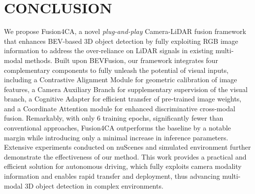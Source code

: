 \documentclass[letterpaper, 10 pt, conference]{ieeeconf}  %
\begin{document}
\section{CONCLUSION}
We propose Fusion4CA, a novel \textit{plug-and-play} Camera-LiDAR fusion framework that enhances BEV-based 3D object detection by fully exploiting RGB image information to address the over-reliance on LiDAR signals in existing multi-modal methods. Built upon BEVFusion, our framework integrates four complementary components to fully unleash the potential of visual inputs, including a Contrastive Alignment Module for geometric calibration of image features, a Camera Auxiliary Branch for supplementary supervision of the visual branch, a Cognitive Adapter \cite{yin20255} for efficient transfer of pre-trained image weights, and a Coordinate Attention module \cite{hou2021coordinate} for enhanced discriminative cross-modal fusion.
Remarkably, with only 6 training epochs, significantly fewer than conventional approaches, Fusion4CA outperforms the baseline by a notable margin while introducing only a minimal increase in inference parameters.
Extensive experiments conducted on nuScenes and simulated environment further demonstrate the effectiveness of our method.
This work provides a practical and efficient solution for autonomous driving, which fully exploits camera modality information and enables rapid transfer and deployment, thus advancing multi-modal 3D object detection in complex environments.






\end{document}
